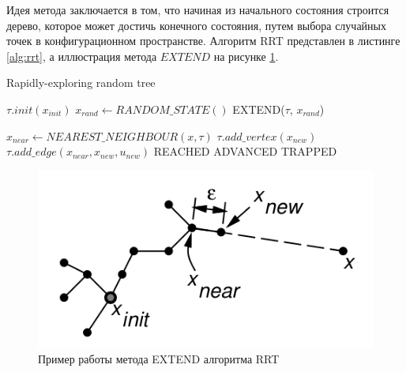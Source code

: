 Идея метода заключается в том, что начиная из начального состояния строится дерево, которое может достичь конечного
состояния, путем выбора случайных точек в конфигурационном пространстве. Алгоритм RRT представлен в листинге
\ref{alg:rrt}, а иллюстрация метода $EXTEND$ на рисунке \ref{img:rrt_extend}.

\begin{algorithm}
    \caption{ Rapidly-exploring random tree }
    \label{alg:rrt}
    \begin{algorithmic}

            $\tau.init(x_{init})$
                \State $x_{rand} \leftarrow RANDOM\_STATE()$
                \State EXTEND($\tau$, $x_{rand}$)
            \EndFor
        \EndFunction

            $x_{near} \leftarrow NEAREST\_NEIGHBOUR(x, \tau)$
                \State $\tau.add\_vertex(x_{new})$
                \State $\tau.add\_edge(x_{near}, x_{new}, u_{new})$
                    \State \Return REACHED
                \Else
                    \State \Return ADVANCED
                \EndIf
            \EndIf
            \Return TRAPPED
        \EndFunction
    \end{algorithmic}
\end{algorithm}

\begin{figure}[h]
    \centering
    \includegraphics[]{images/rrt_extend}
    \caption{Пример работы метода EXTEND алгоритма RRT}
    \label{img:rrt_extend}
\end{figure}

